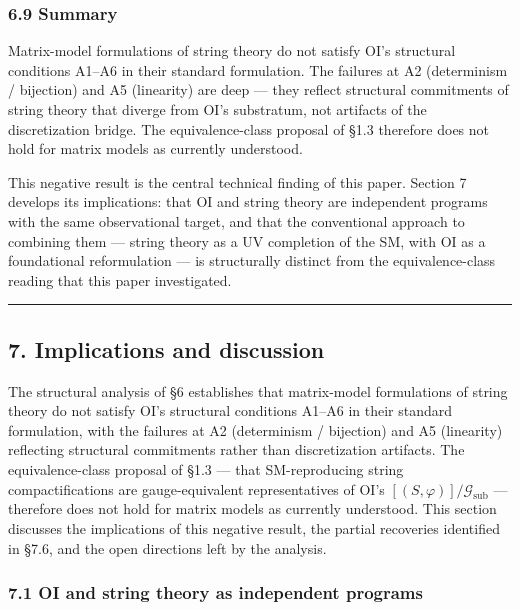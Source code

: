 \documentclass[
]{article}
\begin{document}
\hypertarget{summary}{%
\subsubsection{6.9 Summary}\label{summary}}

Matrix-model formulations of string theory do not satisfy OI's
structural conditions A1--A6 in their standard formulation. The failures
at A2 (determinism / bijection) and A5 (linearity) are deep --- they
reflect structural commitments of string theory that diverge from OI's
substratum, not artifacts of the discretization bridge. The
equivalence-class proposal of §1.3 therefore does not hold for matrix
models as currently understood.

This negative result is the central technical finding of this paper.
Section 7 develops its implications: that OI and string theory are
independent programs with the same observational target, and that the
conventional approach to combining them --- string theory as a UV
completion of the SM, with OI as a foundational reformulation --- is
structurally distinct from the equivalence-class reading that this paper
investigated.

\begin{center}\rule{0.5\linewidth}{0.5pt}\end{center}

\hypertarget{implications-and-discussion}{%
\subsection{7. Implications and
discussion}\label{implications-and-discussion}}

The structural analysis of §6 establishes that matrix-model formulations
of string theory do not satisfy OI's structural conditions A1--A6 in
their standard formulation, with the failures at A2 (determinism /
bijection) and A5 (linearity) reflecting structural commitments rather
than discretization artifacts. The equivalence-class proposal of §1.3
--- that SM-reproducing string compactifications are gauge-equivalent
representatives of OI's \([(S, \varphi)]/\mathcal{G}_{\text{sub}}\) ---
therefore does not hold for matrix models as currently understood. This
section discusses the implications of this negative result, the partial
recoveries identified in §7.6, and the open directions left by the
analysis.

\hypertarget{oi-and-string-theory-as-independent-programs}{%
\subsubsection{7.1 OI and string theory as independent
programs}\label{oi-and-string-theory-as-independent-programs}}
\end{document}
